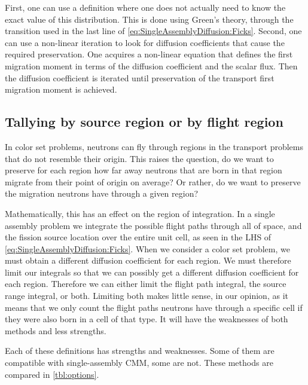 \documentclass[a4paper,letterpaper,12pt,oneside,draft]{article}
\begin{document}
First, one can use a definition where one does not actually need to know the exact value of this distribution.
This is done using Green's theory, through the transition used in the last line of \cref{eq:SingleAssemblyDiffusion:Ficks}.
Second, one can use a non-linear iteration to look for diffusion coefficients that cause the required preservation.
One acquires a non-linear equation that defines the first migration moment in terms of the diffusion coefficient and the scalar flux.
Then the diffusion coefficient is iterated until preservation of the transport first migration moment is achieved.

\subsection{Tallying by source region or by flight region}
In color set problems, neutrons can fly through regions in the transport problems that do not resemble their origin.
This raises the question, do we want to preserve for each region how far away neutrons that are born in that region migrate from their point of origin on average?
Or rather, do we want to preserve the migration neutrons have through a given region?

Mathematically, this has an effect on the region of integration.
In a single assembly problem we integrate the possible flight paths through all of space, and the fission source location over the entire unit cell, as seen in the LHS of \cref{eq:SingleAssemblyDiffusion:Ficks}.
When we consider a color set problem, we must obtain a different diffusion coefficient for each region. We must therefore limit our integrals so that we can possibly get a different diffusion coefficient for each region.
Therefore we can either limit the flight path integral, the source range integral, or both.
Limiting both makes little sense, in our opinion, as it means that we only count the flight paths neutrons have through a specific cell if they were also born in a cell of that type.
It will have the weaknesses of both methods and less strengths.



Each of these definitions has strengths and weaknesses. 
Some of them are compatible with single-assembly CMM, some are not.
These methods are compared in \cref{tbl:options}.
\end{document}
